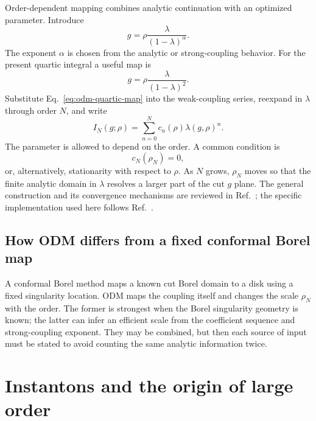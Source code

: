 Order-dependent mapping combines analytic continuation with an optimized
parameter.  Introduce
\begin{equation}
  g=\rho\frac{\lambda}{(1-\lambda)^\alpha}.
  \label{eq:odm-general-map}
\end{equation}
The exponent $\alpha$ is chosen from the analytic or strong-coupling
behavior.  For the present quartic integral a useful map is
\begin{equation}
  g=\rho\frac{\lambda}{(1-\lambda)^2}.
  \label{eq:odm-quartic-map}
\end{equation}
Substitute Eq.~\eqref{eq:odm-quartic-map} into the weak-coupling series,
reexpand in $\lambda$ through order $N$, and write
\begin{equation}
  I_N(g;\rho)=\sum_{n=0}^{N}c_n(\rho)\lambda(g,\rho)^n.
  \label{eq:odm-truncated}
\end{equation}
The parameter is allowed to depend on the order.  A common condition is
\begin{equation}
  c_N(\rho_N)=0,
  \label{eq:odm-fac}
\end{equation}
or, alternatively, stationarity with respect to $\rho$.  As $N$ grows,
$\rho_N$ moves so that the finite analytic domain in $\lambda$ resolves a
larger part of the cut $g$ plane.  The general construction and its
convergence mechanisms are reviewed in Ref.~\cite{Zinn-Justin:2010zzb}; the
specific implementation used here follows
Ref.~\cite{Morikawa:ResummationRepository}.

\subsection{How ODM differs from a fixed conformal Borel map}
\label{subsec:odm-versus-conformal}

A conformal Borel method maps a known cut Borel domain to a disk using a
fixed singularity location.  ODM maps the coupling itself and changes the
scale $\rho_N$ with the order.  The former is strongest when the Borel
singularity geometry is known; the latter can infer an efficient scale from
the coefficient sequence and strong-coupling exponent.  They may be
combined, but then each source of input must be stated to avoid counting the
same analytic information twice.

\section{Instantons and the origin of large order}
\label{sec:instanton-large-order}

